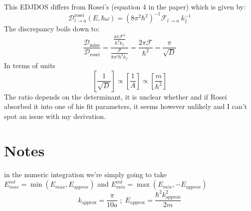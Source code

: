 \documentclass[11pt]{article}
\newcommand{\hw}{\hbar\omega}
\newcommand{\Dc}{\mathcal{D}}
\newcommand{\Fc}{\mathcal{F}}
\begin{document}
\begin{warnbox}
This EDJDOS differs from Rosei's (equation 4 in the paper) which is given by:
$$\Dc_{l\to u}^{\text{rosei}}(E,\hw) = (8\pi^{2}\hbar^{2})^{-1}\Fc_{l\to u}\ k_{\parallel}^{-1}$$
The discrepancy boils down to:
$$\frac{\Dc_{\text{mine}}}{\Dc_{\text{rosei}}} = \frac{\frac{4\pi \Fc^{2}}{\hbar^{4}k_{\parallel}}}{\frac{\Fc}{8\pi^{2}\hbar^{2}k_{\parallel}}} = \frac{2\pi\Fc}{\hbar^{2}} = \frac{\pi}{\sqrt{D}}$$
In terms of units
$$\left[\frac{1}{\sqrt{D}}\right]\propto \left[\frac{1}{A}\right]\propto \left[\frac{m}{\hbar^{2}}\right]$$
The ratio depends on the determinant, it is unclear whether and if Rosei absorbed it into one of his fit parameters, it seems however unlikely and I can't spot an issue with my derivation.
\end{warnbox}

\section*{Notes}
in the numeric integration we're simply going to take $E_{max}^{int}=\min(E_{max},E_{approx})$ and $E_{min}^{int}=\max(E_{min},-E_{approx})$
\begin{equation}
k_{\text{approx}}=\frac{\pi}{10a} \;;\; E_{\text{approx}}= \frac{\hbar^{2}k_{\text{approx}}^{2}}{2m}
\tag{5.1}
\end{equation}
\end{document}
